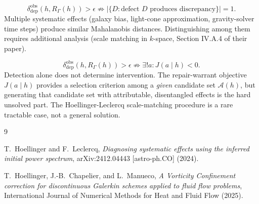 \documentclass[11pt]{article}
\newcommand{\RGam}{R_\Gamma}
\newcommand{\Repobj}{J}
\newcommand{\dobs}{\delta_{\mathrm{dep}}^{\mathrm{obs}}}
\begin{document}
\begin{proposition}
\[
\dobs(h, \RGam(h)) > \epsilon \not\Rightarrow |\{D : \text{defect } D \text{ produces discrepancy}\}| = 1.
\]
Multiple systematic effects (galaxy bias, light-cone approximation, gravity-solver time steps) produce similar Mahalanobis distances. Distinguishing among them requires additional analysis (scale matching in $k$-space, Section IV.A.4 of their paper).
\end{proposition}

\begin{proposition}
\[
\dobs(h, \RGam(h)) > \epsilon \not\Rightarrow \exists! a : \Repobj(a \mid h) < 0.
\]
Detection alone does not determine intervention. The repair-warrant objective $\Repobj(a \mid h)$ provides a selection criterion among a \emph{given} candidate set $\mathcal{A}(h)$, but generating that candidate set with attributable, disentangled effects is the hard unsolved part. The Hoellinger-Leclercq scale-matching procedure is a rare tractable case, not a general solution.
\end{proposition}

\begin{thebibliography}{9}

T.~Hoellinger and F.~Leclercq,
\emph{Diagnosing systematic effects using the inferred initial power spectrum},
arXiv:2412.04443 [astro-ph.CO] (2024).

T.~Hoellinger, J.-B.~Chapelier, and L.~Manueco,
\emph{A Vorticity Confinement correction for discontinuous Galerkin schemes applied to fluid flow problems},
International Journal of Numerical Methods for Heat and Fluid Flow (2025).

\end{thebibliography}
\end{document}
